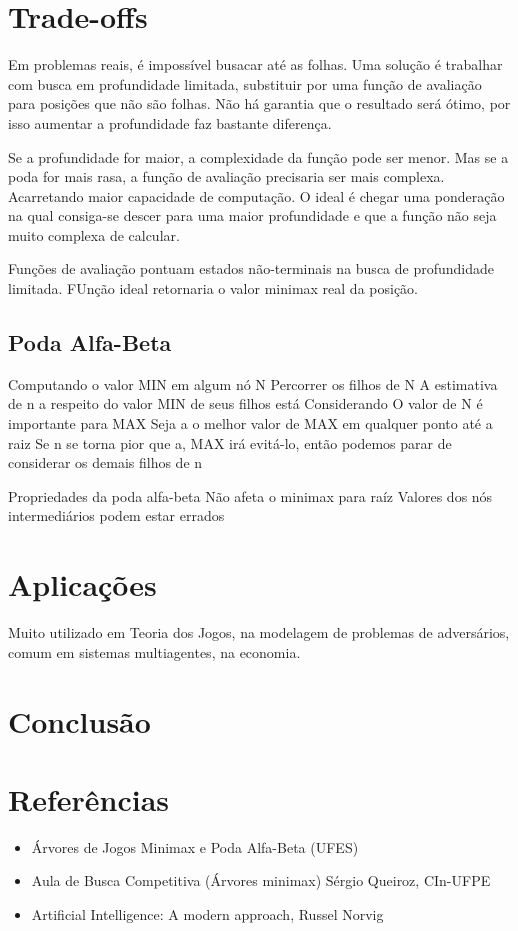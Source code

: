\documentclass[sigplan,screen]{acmart}
\begin{document}
\section{Trade-offs}

Em problemas reais, é impossível busacar até as folhas. 
Uma solução é trabalhar com busca em profundidade limitada, substituir por uma função de avaliação para posições que não são folhas.
Não há garantia que o resultado será ótimo, por isso aumentar a profundidade faz bastante diferença.

Se a profundidade for maior, a complexidade da função pode ser menor. Mas se a poda for mais rasa, a função de avaliação precisaria ser mais complexa. 
Acarretando maior capacidade de computação. 
O ideal é chegar uma ponderação na qual consiga-se descer para uma maior profundidade e que a função não seja muito complexa de calcular.

Funções de avaliação pontuam estados não-terminais na busca de profundidade limitada.
FUnção ideal retornaria o valor minimax real da posição.

\subsection{Poda Alfa-Beta}
Computando o valor MIN em algum nó N
Percorrer os filhos de N
A estimativa de n a respeito do valor MIN de seus filhos está Considerando
O valor de N é importante para MAX
Seja a o melhor valor de MAX em qualquer ponto até a raiz
Se n se torna pior que a, MAX irá evitá-lo, então podemos parar de considerar os demais filhos de n

Propriedades da poda alfa-beta
Não afeta o minimax para raíz
Valores dos nós intermediários podem estar errados

\section{Aplicações}
Muito utilizado em Teoria dos Jogos, na modelagem de problemas de adversários, comum em sistemas multiagentes, na economia.

\section{Conclusão}

\section{Referências}
\begin{itemize}
  \item {Árvores de Jogos Minimax e Poda Alfa-Beta (UFES)}\
  \item {Aula de Busca Competitiva (Árvores minimax) Sérgio Queiroz, CIn-UFPE}\
  \item {Artificial Intelligence: A modern approach, Russel Norvig}\
\end{itemize}



\end{document}
